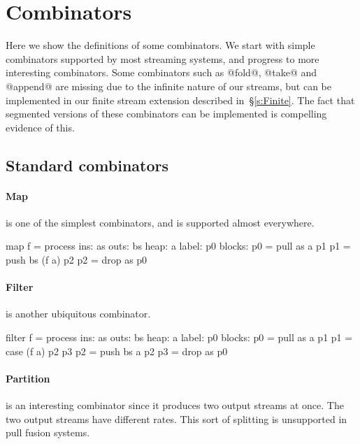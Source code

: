\appendix
\section{Combinators}
\label{s:Combinators}

Here we show the definitions of some combinators.
We start with simple combinators supported by most streaming systems, and progress to more interesting combinators.
Some combinators such as @fold@, @take@ and @append@ are missing due to the infinite nature of our streams, but can be implemented in our finite stream extension described in~\S\ref{s:Finite}.
The fact that segmented versions of these combinators can be implemented is compelling evidence of this.

\subsection{Standard combinators}

\paragraph{Map} is one of the simplest combinators, and is supported almost everywhere.

\begin{code}
map f = process
     ins: as
    outs: bs
    heap: {a}
   label: p0
  blocks: p0 = pull as    a  p1
          p1 = push bs (f a) p2
          p2 = drop as       p0
\end{code}

\paragraph{Filter} is another ubiquitous combinator.

\begin{code}
filter f = process
     ins: as
    outs: bs
    heap: {a}
   label: p0
  blocks: p0 = pull as    a  p1
          p1 = case    (f a) p2 p3
          p2 = push bs    a  p2
          p3 = drop as       p0
\end{code}

\paragraph{Partition} is an interesting combinator since it produces two output streams at once.
The two output streams have different rates.
This sort of splitting is unsupported in pull fusion systems.

